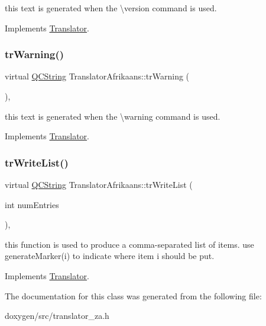 this text is generated when the \textbackslash{}version command is used. 

Implements \mbox{\hyperlink{class_translator}{Translator}}.

\mbox{\label{class_translator_afrikaans_a2eb892898bfd601515b9fa788c1638d5}} 
\subsubsection{\texorpdfstring{trWarning()}{trWarning()}}
{\footnotesize\ttfamily virtual \mbox{\hyperlink{class_q_c_string}{Q\+C\+String}} Translator\+Afrikaans\+::tr\+Warning (\begin{DoxyParamCaption}{ }\end{DoxyParamCaption})\hspace{0.3cm}{\ttfamily [inline]}, {\ttfamily [virtual]}}

this text is generated when the \textbackslash{}warning command is used. 

Implements \mbox{\hyperlink{class_translator}{Translator}}.

\mbox{\label{class_translator_afrikaans_a3632bba90e298ca90fd43d2cd5d1257a}} 
\subsubsection{\texorpdfstring{trWriteList()}{trWriteList()}}
{\footnotesize\ttfamily virtual \mbox{\hyperlink{class_q_c_string}{Q\+C\+String}} Translator\+Afrikaans\+::tr\+Write\+List (\begin{DoxyParamCaption}\item[{int}]{num\+Entries }\end{DoxyParamCaption})\hspace{0.3cm}{\ttfamily [inline]}, {\ttfamily [virtual]}}

this function is used to produce a comma-\/separated list of items. use generate\+Marker(i) to indicate where item i should be put. 

Implements \mbox{\hyperlink{class_translator}{Translator}}.



The documentation for this class was generated from the following file\+:\begin{DoxyCompactItemize}
\item 
doxygen/src/translator\+\_\+za.\+h\end{DoxyCompactItemize}
